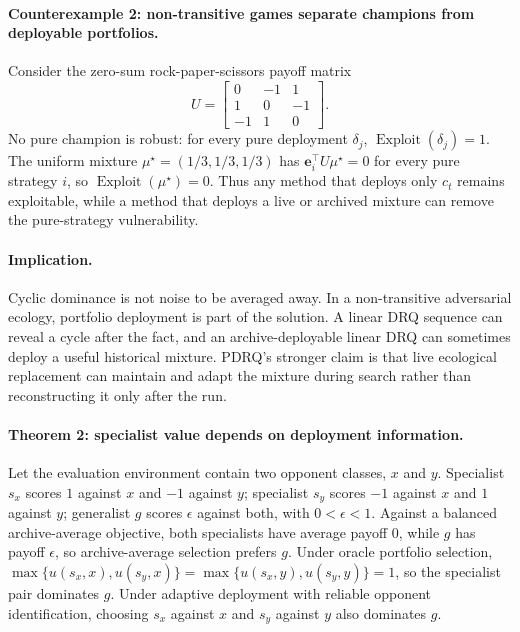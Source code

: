\documentclass[11pt]{article}
\begin{document}
\paragraph{Counterexample 2: non-transitive games separate champions from deployable portfolios.}
Consider the zero-sum rock-paper-scissors payoff matrix
\[
U =
\begin{bmatrix}
0 & -1 & 1\\
1 & 0 & -1\\
-1 & 1 & 0
\end{bmatrix}.
\]
No pure champion is robust: for every pure deployment $\delta_j$, $\operatorname{Exploit}(\delta_j)=1$. The uniform mixture $\mu^\star=(1/3,1/3,1/3)$ has $\mathbf{e}_i^\top U \mu^\star=0$ for every pure strategy $i$, so $\operatorname{Exploit}(\mu^\star)=0$. Thus any method that deploys only $c_t$ remains exploitable, while a method that deploys a live or archived mixture can remove the pure-strategy vulnerability.

\paragraph{Implication.}
Cyclic dominance is not noise to be averaged away. In a non-transitive adversarial ecology, portfolio deployment is part of the solution. A linear DRQ sequence can reveal a cycle after the fact, and an archive-deployable linear DRQ can sometimes deploy a useful historical mixture. PDRQ's stronger claim is that live ecological replacement can maintain and adapt the mixture during search rather than reconstructing it only after the run.

\paragraph{Theorem 2: specialist value depends on deployment information.}
Let the evaluation environment contain two opponent classes, $x$ and $y$. Specialist $s_x$ scores $1$ against $x$ and $-1$ against $y$; specialist $s_y$ scores $-1$ against $x$ and $1$ against $y$; generalist $g$ scores $\epsilon$ against both, with $0<\epsilon<1$. Against a balanced archive-average objective, both specialists have average payoff $0$, while $g$ has payoff $\epsilon$, so archive-average selection prefers $g$. Under oracle portfolio selection, $\max\{u(s_x,x),u(s_y,x)\}=\max\{u(s_x,y),u(s_y,y)\}=1$, so the specialist pair dominates $g$. Under adaptive deployment with reliable opponent identification, choosing $s_x$ against $x$ and $s_y$ against $y$ also dominates $g$.
\end{document}
